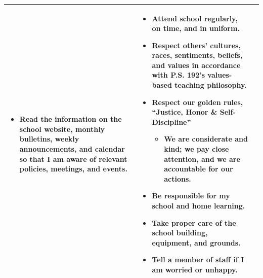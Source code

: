 \documentclass[10pt,letterpaper]{article}
\begin{document}
\begin{tabular}{|p{3.2in}|p{3.2in}|p{3.2in}|}
\begin{itemize}
	behavioral policies are upheld.
	\item Read the information on the school website, monthly bulletins, weekly
	announcements, and calendar so that I am aware of relevant policies, 
	meetings, and events.
	\end{itemize}
 	& 
 	\begin{itemize}
 	\item Attend school regularly, on time, and in uniform.
 	\item Respect others’ cultures, races, sentiments, beliefs, and values in 
 	accordance with P.S. 192’s values-based teaching philosophy.
 	\item Respect our golden rules, “Justice, Honor \& Self-Discipline”
 		\begin{itemize}
 		\item We are considerate and kind; we pay close attention, and we are 
 		accountable for our actions.
 		\end{itemize}
	\item Be responsible for my school and home learning.
	\item Take proper care of the school building, equipment, and grounds.
	\item Tell a member of staff if I am worried or unhappy.
 	\end{itemize}
 \\\hline

\end{tabular}
	
\end{document}
